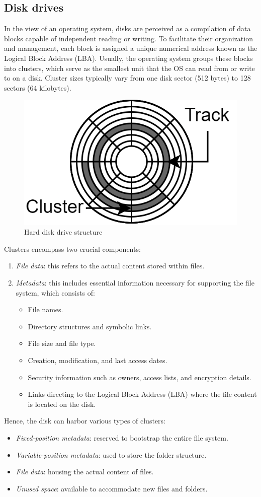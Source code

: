 \subsection{Disk drives}
In the view of an operating system, disks are perceived as a compilation of data blocks capable of independent reading or writing. 
To facilitate their organization and management, each block is assigned a unique numerical address known as the Logical Block Address (LBA). 
Usually, the operating system groups these blocks into clusters, which serve as the smallest unit that the OS can read from or write to on a disk. 
Cluster sizes typically vary from one disk sector (512 bytes) to 128 sectors (64 kilobytes).
\begin{figure}[H]
    \centering
    \includegraphics[width=0.4\linewidth]{images/hdd.png}
    \caption{Hard disk drive structure}
\end{figure}
Clusters encompass two crucial components:
\begin{enumerate}
    \item \textit{File data}: this refers to the actual content stored within files.
    \item \textit{Metadata}: this includes essential information necessary for supporting the file system, which consists of:
        \begin{itemize}
            \item File names.
            \item Directory structures and symbolic links.
            \item File size and file type.
            \item Creation, modification, and last access dates.
            \item Security information such as owners, access lists, and encryption details.
            \item Links directing to the Logical Block Address (LBA) where the file content is located on the disk.
        \end{itemize}
\end{enumerate}
Hence, the disk can harbor various types of clusters:
\begin{itemize}
    \item \textit{Fixed-position metadata}: reserved to bootstrap the entire file system.
    \item \textit{Variable-position metadata}: used to store the folder structure.
    \item \textit{File data}: housing the actual content of files.
    \item \textit{Unused space}: available to accommodate new files and folders.
\end{itemize}

